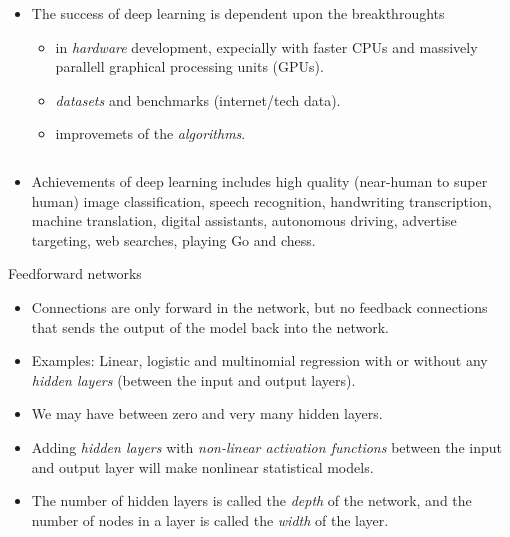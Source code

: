 \documentclass[
  10pt,
  ignorenonframetext,
]{beamer}
\providecommand{\tightlist}{%
  \setlength{\itemsep}{0pt}\setlength{\parskip}{0pt}}
\begin{document}
\begin{frame}
\begin{itemize}
\tightlist
\item
  The success of deep learning is dependent upon the breakthroughts

  \begin{itemize}
  \tightlist
  \item
    in \emph{hardware} development, expecially with faster CPUs and
    massively parallell graphical processing units (GPUs).
  \item
    \emph{datasets} and benchmarks (internet/tech data).
  \item
    improvemets of the \emph{algorithms}.
  \end{itemize}
\end{itemize}

\(~\)

\begin{itemize}
\tightlist
\item
  Achievements of deep learning includes high quality (near-human to
  super human) image classification, speech recognition, handwriting
  transcription, machine translation, digital assistants, autonomous
  driving, advertise targeting, web searches, playing Go and chess.
\end{itemize}
\end{frame}

\begin{frame}{Feedforward networks}
\protect\hypertarget{feedforward-networks}{}
\begin{itemize}
\item
  Connections are only forward in the network, but no feedback
  connections that sends the output of the model back into the network.
\item
  Examples: Linear, logistic and multinomial regression with or without
  any \emph{hidden layers} (between the input and output layers).
\item
  We may have between zero and very many hidden layers.
\item
  Adding \emph{hidden layers} with \emph{non-linear activation
  functions} between the input and output layer will make nonlinear
  statistical models.
\item
  The number of hidden layers is called the \emph{depth} of the network,
  and the number of nodes in a layer is called the \emph{width} of the
  layer.
\end{itemize}
\end{frame}
\end{document}
